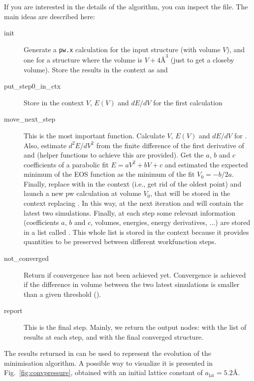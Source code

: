 If you are interested in the details of the algorithm, you can inspect the file. The main ideas are described here:
\begin{description}
\item[init] Generate a \texttt{pw.x} calculation for the input structure (with volume $V$), and one for a structure where the volume is $V+4\text{\AA}^3$ (just to get a closeby volume). Store the results in the context as  and 
\item[put\_step0\_in\_ctx] Store in the context $V$, $E(V)$ and $dE/dV$ for the first calculation 
\item[move\_next\_step] This is the most important function. Calculate $V$, $E(V)$ and $dE/dV$ for . Also, estimate $d^2E/dV^2$ from the finite difference of the first derivative of  and  (helper functions to achieve this are provided).
Get the $a$, $b$ and $c$ coefficients of a parabolic fit $E=aV^2 + bV + c$ and estimated the expected minimum of the EOS function as the minimum of the fit $V_0=-b/2a$. Finally, replace  with  in the context (i.e., get rid of the oldest point) and launch a new pw calculation at volume $V_0$, that will be stored in the context replacing . In this way, at the next iteration  and  will contain the latest two simulations. Finally, at each step some relevant information (coefficients $a$, $b$ and $c$, volumes, energies, energy derivatives, ...) are stored in a list called . This whole list is stored in the context because it provides quantities to be preserved between different workfunction steps.
\item[not\_converged] Return  if convergence has not been achieved yet. Convergence is achieved if the difference in volume between the two latest simulations is smaller than a given threshold ().
\item[report] This is the final step. Mainly, we return the output nodes:  with the list of results at each step, and  with the final converged structure.
\end{description}

The results returned in  can be used to represent the evolution of the minimisation algorithm. A possible way to visualize it is presented in Fig.~\ref{fig:convpressure}, obtained with an initial lattice constant of $a_{\text{lat}} = 5.2\text{\AA}$. 

